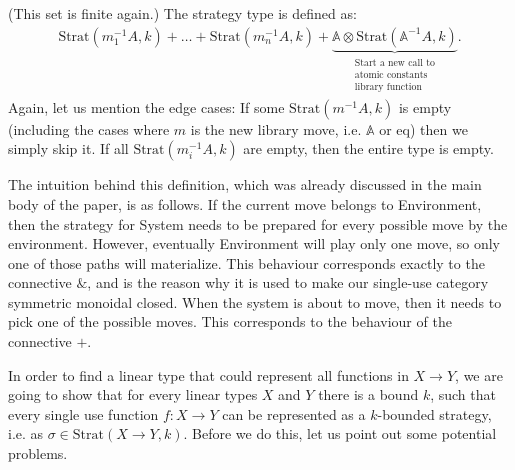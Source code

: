 \documentclass[10pt,a4paper]{amsart}
\numberwithin{equation}{section}
\theoremstyle{plain}
\newcommand{\atoms}{\mathbb A}
\newcommand{\Strat}{\text{Strat}}
\begin{document}
\begin{definition}
\begin{itemize}
\begin{itemize}
               (This set is finite again.) The strategy type is defined as: 
               \begin{align*}
                \Strat(m_1^{-1}A, k) + \ldots + \Strat(m_n^{-1}A, k) + \underbrace{\atoms \otimes \Strat(\atoms^{-1}A, k)}_{\substack{\textrm{Start a new call to}\\
                \textrm{atomic constants}\\
                \textrm{library function}}}.
               \end{align*}
               Again, let us mention the edge cases: If some $\Strat(m^{-1}A, k)$ is empty (including the cases where $m$ is the new library move, i.e. $\atoms$ or $\text{eq}$)
               then we simply skip it. If all $\Strat(m_i^{-1}A, k)$ are empty, then the entire type is empty.
    \end{itemize}
\end{itemize}
\end{definition}
The intuition behind this definition, which was already discussed in the main body of the paper, is as follows. If the current move belongs to Environment, then the strategy 
for System needs to be prepared for every possible move by the environment. However, eventually Environment 
will play only one move, so only one of those paths will materialize. This behaviour corresponds exactly to the connective $\&$, and is the reason why  it is used to make our single-use category symmetric monoidal closed.
When the system is about to move, then it needs to pick one of the possible moves. This corresponds to the behaviour of the connective $+$.

In order to find a linear type that could represent all functions in $X \to Y$, we are going to show 
that for every linear types $X$ and $Y$ there is a bound $k$, such that every single use function $f : X \to Y$
can be represented as a $k$-bounded strategy, i.e. as $\sigma \in \Strat(X \to Y, k)$. Before we do this, 
let us point out some potential problems. 
\end{document}
